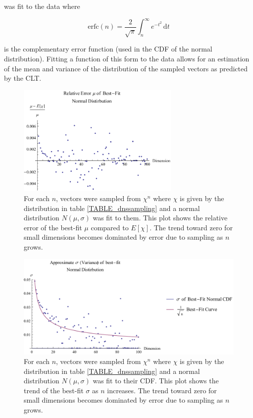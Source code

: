 \documentclass[12pt]{report}
\theoremstyle{remark}
\theoremstyle{definition}
\theoremstyle{definition}
\theoremstyle{definition}
\begin{document}
was fit to the data where 

\begin{equation}
\textrm{erfc}(n)=\frac{2}{\sqrt{\pi}} \int_n^{\infty}
e^{-t^2}\,\mathrm dt
\end{equation}

is the complementary error function (used in the CDF of the normal
distribution). Fitting a function of this form to the data allows for an estimation
of the mean and variance of the distribution of the sampled vectors as predicted
by the CLT.

\begin{figure}
\centering
\includegraphics[width=0.7\textwidth]{figures/dnssampling-muerror.pdf}
\caption[Relative Error of $\mu$ of Best-Fit Normal Distribution of Sampled Expected Value]
{For each $n$, vectors were sampled from $\chi^n$ where $\chi$ is given by the
distribution in table \ref{TABLE_dnssampling} and a normal distribution
$N(\mu,\sigma)$ was fit to them. This plot shows the relative error of the
best-fit $\mu$ compared to $E[\chi]$. The trend toward zero for small dimensions
becomes dominated by error due to sampling as $n$ grows.}
\label{dnssampling-muerror}
\end{figure}

\begin{figure}
\centering
\includegraphics[width=\textwidth]{figures/dnssampling-sigmafit.pdf}
\caption[Trend of $\sigma$ of Best-Fit Normal Distribution of Sampled Expected Value]
{For each $n$, vectors were sampled from $\chi^n$ where $\chi$ is given by the
distribution in table \ref{TABLE_dnssampling} and a normal distribution
$N(\mu,\sigma)$ was fit to their CDF. This plot shows the trend of the best-fit
$\sigma$ as $n$ increases. The trend toward zero for small dimensions becomes
dominated by error due to sampling as $n$ grows.}
\label{dnssampling-sigmafit}
\end{figure}
\end{document}
